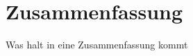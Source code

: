

\section{Zusammenfassung}
\begin{itshape}
Was halt in eine Zusammenfassung kommt
\end{itshape}






